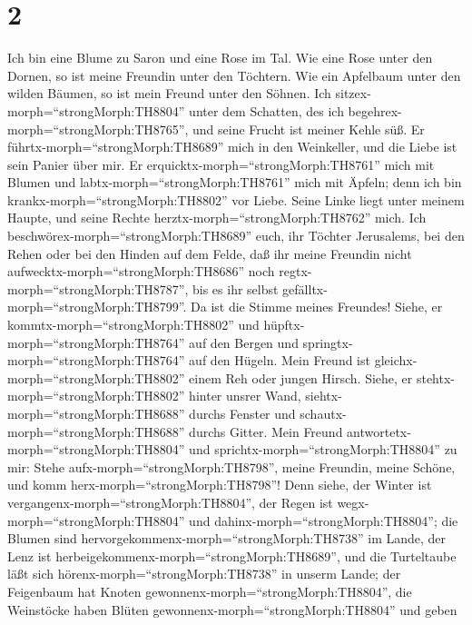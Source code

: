 \hypertarget{section-1}{%
\section{2}\label{section-1}}

 Ich bin eine Blume zu Saron und eine Rose im Tal.
 Wie eine Rose unter den Dornen, so ist meine Freundin unter
den Töchtern.  Wie ein Apfelbaum unter den wilden Bäumen, so
ist mein Freund unter den Söhnen. Ich
sitzex-morph=``strongMorph:TH8804'' unter dem Schatten, des ich
begehrex-morph=``strongMorph:TH8765'', und seine Frucht ist meiner Kehle
süß.  Er führtx-morph=``strongMorph:TH8689'' mich in den
Weinkeller, und die Liebe ist sein Panier über mir.  Er
erquicktx-morph=``strongMorph:TH8761'' mich mit Blumen und
labtx-morph=``strongMorph:TH8761'' mich mit Äpfeln; denn ich bin
krankx-morph=``strongMorph:TH8802'' vor Liebe.  Seine Linke
liegt unter meinem Haupte, und seine Rechte
herztx-morph=``strongMorph:TH8762'' mich.  Ich
beschwörex-morph=``strongMorph:TH8689'' euch, ihr Töchter Jerusalems,
bei den Rehen oder bei den Hinden auf dem Felde, daß ihr meine Freundin
nicht aufwecktx-morph=``strongMorph:TH8686'' noch
regtx-morph=``strongMorph:TH8787'', bis es ihr selbst
gefälltx-morph=``strongMorph:TH8799''.  Da ist die Stimme
meines Freundes! Siehe, er kommtx-morph=``strongMorph:TH8802'' und
hüpftx-morph=``strongMorph:TH8764'' auf den Bergen und
springtx-morph=``strongMorph:TH8764'' auf den Hügeln.  Mein
Freund ist gleichx-morph=``strongMorph:TH8802'' einem Reh oder jungen
Hirsch. Siehe, er stehtx-morph=``strongMorph:TH8802'' hinter unsrer
Wand, siehtx-morph=``strongMorph:TH8688'' durchs Fenster und
schautx-morph=``strongMorph:TH8688'' durchs Gitter.  Mein
Freund antwortetx-morph=``strongMorph:TH8804'' und
sprichtx-morph=``strongMorph:TH8804'' zu mir: Stehe
aufx-morph=``strongMorph:TH8798'', meine Freundin, meine Schöne, und
komm herx-morph=``strongMorph:TH8798''!  Denn siehe, der
Winter ist vergangenx-morph=``strongMorph:TH8804'', der Regen ist
wegx-morph=``strongMorph:TH8804'' und
dahinx-morph=``strongMorph:TH8804'';  die Blumen sind
hervorgekommenx-morph=``strongMorph:TH8738'' im Lande, der Lenz ist
herbeigekommenx-morph=``strongMorph:TH8689'', und die Turteltaube läßt
sich hörenx-morph=``strongMorph:TH8738'' in unserm Lande; 
der Feigenbaum hat Knoten gewonnenx-morph=``strongMorph:TH8804'', die
Weinstöcke haben Blüten gewonnenx-morph=``strongMorph:TH8804'' und geben
